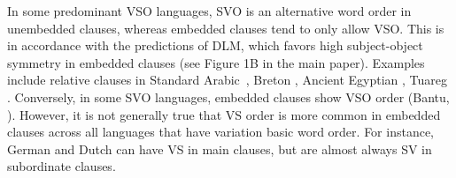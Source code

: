 \documentclass[11pt,a4paper]{article}
\begin{document}
In some predominant VSO languages, SVO is an alternative word order in unembedded clauses, whereas embedded clauses tend to only allow VSO.
This is in accordance with the predictions of DLM, which favors high subject-object symmetry in embedded clauses (see Figure 1B in the main paper).
Examples include relative clauses in Standard Arabic~\citep{alqurashi:2012}, Breton \citep[][p. 80]{timm1988relative}, Ancient Egyptian \citep{gardiner1957egyptian}, Tuareg \citep[Chapter 12.1.2]{heath2005a}.
Conversely, in some SVO languages, embedded clauses show VSO order (Bantu, \citet{demuth1999verb}).
However, it is not generally true that VS order is more common in embedded clauses across all languages that have variation basic word order. For instance, German and Dutch can have VS in main clauses, but are almost always SV in subordinate clauses.





\end{document}
